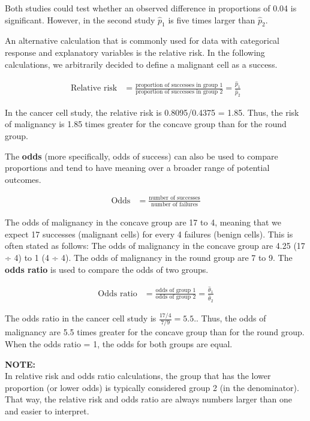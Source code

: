 \documentclass[
]{report}
\begin{document}
Both studies could test whether an observed difference in proportions of 0.04 is significant. However, in the second study \emph{\(\hat p_1\)} is five times larger than \emph{\(\hat p_2\)}.

An alternative calculation that is commonly used for data with categorical response and explanatory variables is the relative risk. In the following calculations, we arbitrarily decided to define a malignant cell as a success.

\begin{align}\label{6.4}
\text{Relative risk} &= \frac{\text{proportion of successes in group 1}}{\text{proportion of successes in group 2}} = \frac{\hat p_1}{\hat p_2} \tag{6.4}
\end{align}

In the cancer cell study, the relative risk is 0.8095/0.4375 = 1.85. Thus, the risk of malignancy is 1.85 times greater for the concave group than for the round group.

The \textbf{odds} (more specifically, odds of success) can also be used to compare proportions and tend to have meaning over a broader range of potential outcomes.

\begin{align}\label{6.5}
\text{Odds} &= \frac{\text{number of successes}}{\text{number of failures}} \tag{6.5}
\end{align}

The odds of malignancy in the concave group are 17 to 4, meaning that we expect 17 successes (malignant cells) for every 4 failures (benign cells). This is often stated as follows: The odds of malignancy in the concave group are 4.25 (17 ÷ 4) to 1 (4 ÷ 4). The odds of malignancy in the round group are 7 to 9. The \textbf{odds ratio} is used to compare the odds of two groups.

\begin{align}\label{6.6}
\text{Odds ratio} &= \frac{\text{odds of group 1}}{\text{odds of group 2}} = \frac{\hat\theta_1}{\hat\theta_2} \tag{6.6}
\end{align}

The odds ratio in the cancer cell study is \(\frac{17/4}{7/9} = 5.5.\). Thus, the odds of malignancy are 5.5 times greater for the concave group than for the round group. When the odds ratio = 1, the odds for both groups are equal.

\large

\textbf{NOTE:}\\
In relative risk and odds ratio calculations, the group that has the lower proportion (or lower odds) is typically considered group 2 (in the denominator). That way, the relative risk and odds ratio are always numbers larger than one and easier to interpret.\\
\normalsize
\end{document}
